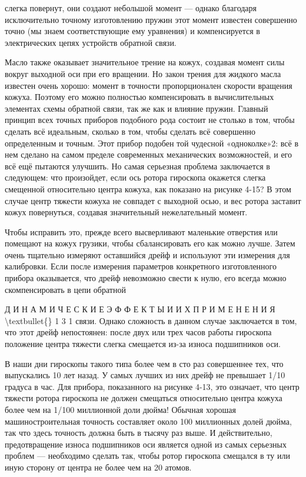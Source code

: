 \documentclass[10pt,oneside]{article}
\begin{document}
слегка повернут, они создают небольшой момент --- однако благодаря исключительно точному изготовлению пружин этот момент известен совершенно точно (мы знаем соответствующие ему уравнения) и компенсируется в электрических цепях устройств обратной связи.\par

Масло также оказывает значительное трение на кожух, создавая момент силы вокруг выходной оси при его вращении. Но закон трения для жидкого масла известен очень хорошо: момент в точности пропорционален скорости вращения кожуха. Поэтому его можно полностью компенсировать в вычислительных элементах схемы обратной связи, так же как и влияние пружин. Главный принцип всех точных приборов подобного рода состоит не столько в том, чтобы сделать всё идеальным, сколько в том, чтобы сделать всё совершенно определенным и точным. Этот прибор подобен той чудесной «одноколке»2: всё в нем сделано на самом пределе современных механических возможностей, и его всё ещё пытаются улучшить. Но самая серьезная проблема заключается в следующем: что произойдет, если ось ротора гироскопа окажется слегка смещенной относительно центра кожуха, как показано на рисунке 4-15? В этом случае центр тяжести кожуха не совпадет с выходной осью, и вес ротора заставит кожух повернуться, создавая значительный нежелательный момент.\par

Чтобы исправить это, прежде всего высверливают маленькие отверстия или помещают на кожух грузики, чтобы сбалансировать его как можно лучше. Затем очень тщательно измеряют оставшийся дрейф и используют эти измерения для калибровки. Если после измерения параметров конкретного изготовленного прибора оказывается, что дрейф невозможно свести к нулю, его всегда можно скомпенсировать в цепи обратной\par

Д И Н А М И Ч Е С К И Е  Э Ф Ф Е К Т Ы  И  И Х  П Р И М Е Н Е Н И Я \textbackslash{}textbullet\{\} 1 3 1 связи. Однако сложность в данном случае заключается в том, что этот дрейф непостоянен: после двух или трех часов работы гироскопа положение центра тяжести слегка смещается из-за износа подшипников оси.\par

В наши дни гироскопы такого типа более чем в сто раз совершеннее тех, что выпускались 10 лет назад. У самых лучших из них дрейф не превышает 1/10 градуса в час. Для прибора, показанного на рисунке 4-13, это означает, что центр тяжести ротора гироскопа не должен смещаться относительно центра кожуха более чем на 1/100 миллионной доли дюйма! Обычная хорошая машиностроительная точность составляет около 100 миллионных долей дюйма, так что здесь точность должна быть в тысячу раз выше. И действительно, предотвращение износа подшипников оси является одной из самых серьезных проблем --- необходимо сделать так, чтобы ротор гироскопа смещался в ту или иную сторону от центра не более чем на 20 атомов.\par
\end{document}

